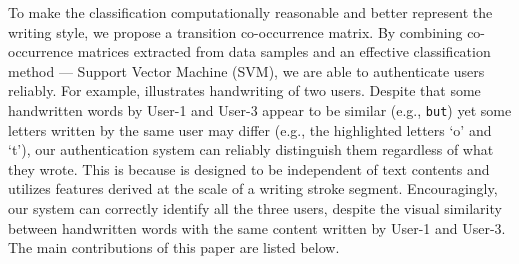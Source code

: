 To make the classification computationally reasonable and better represent the writing style, we propose a transition co-occurrence matrix. %
 By combining co-occurrence matrices extracted from data samples and an effective classification method --- Support Vector Machine (SVM), we are able to authenticate users reliably.  For example,   illustrates handwriting of two users. Despite that some handwritten words by User-1 and User-3 appear to be similar (e.g., \texttt{but}) yet some letters written by the same user may differ (e.g., the highlighted letters `o' and `t'), our authentication system can reliably distinguish them regardless of what they wrote. This is because \CiT is designed to be independent of text contents and utilizes features derived at the scale of a writing stroke segment.
Encouragingly, our system can correctly identify all the three users, despite the visual similarity between handwritten words with the same content written by User-1 and User-3. %
%
%
The main contributions of this paper are listed below. 
